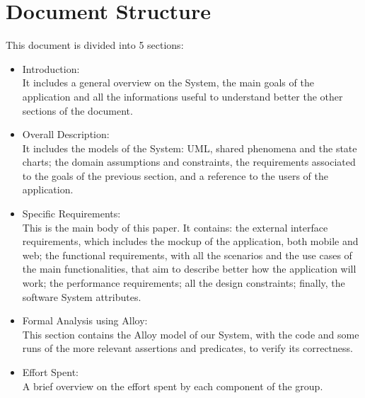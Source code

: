 \section{Document Structure}
This document is divided into 5 sections:
\begin{itemize}
\item Introduction:\\
It includes a general overview on the System, the main goals of the application and all the informations useful to understand better the other sections of the document.

\item Overall Description:\\
It includes the models of the System: UML, shared phenomena and the state charts; the domain assumptions and constraints, the requirements associated to the goals of the previous section, and a reference to the users of the application.

\item Specific Requirements: \\
This is the main body of this paper. It contains: the external interface requirements, which includes the mockup of the application, both mobile and web; the functional requirements, with all the scenarios and the use cases of the main functionalities, that aim to describe better how the application will work; the performance requirements; all the design constraints; finally, the software System attributes.

\item Formal Analysis using Alloy: \\
This section contains the Alloy model of our System, with the code and some runs of the more relevant assertions and predicates, to verify its correctness.

\item Effort Spent:\\
A brief overview on the effort spent by each component of the group.




\end{itemize}